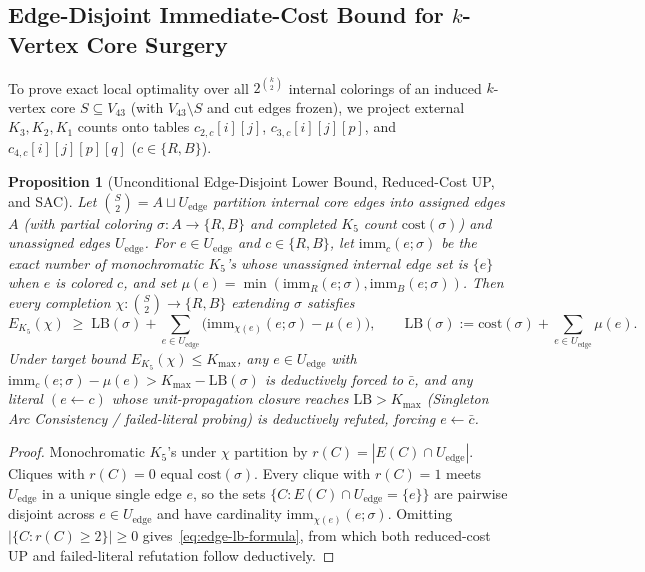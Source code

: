 \documentclass[11pt,a4paper]{article}
\theoremstyle{plain}
\newtheorem{proposition}[theorem]{Proposition}
\theoremstyle{definition}
\begin{document}
\subsection{Edge-Disjoint Immediate-Cost Bound for \texorpdfstring{$k$}{k}-Vertex Core Surgery}

To prove exact local optimality over all $2^{\binom{k}{2}}$ internal colorings of an induced $k$-vertex core $S \subseteq V_{43}$ (with $V_{43} \setminus S$ and cut edges frozen), we project external $K_3, K_2, K_1$ counts onto tables $c_{2,c}[i][j]$, $c_{3,c}[i][j][p]$, and $c_{4,c}[i][j][p][q]$ ($c \in \{R,B\}$).

\begin{proposition}[Unconditional Edge-Disjoint Lower Bound, Reduced-Cost UP, and SAC]\label{prop:edge-lb}
Let $\binom{S}{2} = A \sqcup U_{\mathrm{edge}}$ partition internal core edges into assigned edges $A$ (with partial coloring $\sigma : A \to \{R,B\}$ and completed $K_5$ count $\mathrm{cost}(\sigma)$) and unassigned edges $U_{\mathrm{edge}}$. For $e \in U_{\mathrm{edge}}$ and $c \in \{R,B\}$, let $\mathrm{imm}_c(e;\sigma)$ be the exact number of monochromatic $K_5$'s whose unassigned internal edge set is $\{e\}$ when $e$ is colored $c$, and set $\mu(e) = \min(\mathrm{imm}_R(e;\sigma), \mathrm{imm}_B(e;\sigma))$. Then every completion $\chi : \binom{S}{2} \to \{R,B\}$ extending $\sigma$ satisfies
\begin{equation}\label{eq:edge-lb-formula}
  E_{K_5}(\chi) \;\ge\; \mathrm{LB}(\sigma) + \sum_{e \in U_{\mathrm{edge}}} \bigl(\mathrm{imm}_{\chi(e)}(e;\sigma) - \mu(e)\bigr),
  \qquad \mathrm{LB}(\sigma) := \mathrm{cost}(\sigma) + \sum_{e \in U_{\mathrm{edge}}} \mu(e).
\end{equation}
Under target bound $E_{K_5}(\chi) \le K_{\max}$, any $e \in U_{\mathrm{edge}}$ with $\mathrm{imm}_c(e;\sigma) - \mu(e) > K_{\max} - \mathrm{LB}(\sigma)$ is deductively forced to $\bar{c}$, and any literal $(e \leftarrow c)$ whose unit-propagation closure reaches $\mathrm{LB} > K_{\max}$ (Singleton Arc Consistency / failed-literal probing) is deductively refuted, forcing $e \leftarrow \bar{c}$.
\end{proposition}
\begin{proof}
Monochromatic $K_5$'s under $\chi$ partition by $r(C) = |E(C) \cap U_{\mathrm{edge}}|$. Cliques with $r(C) = 0$ equal $\mathrm{cost}(\sigma)$. Every clique with $r(C) = 1$ meets $U_{\mathrm{edge}}$ in a unique single edge $e$, so the sets $\{C : E(C) \cap U_{\mathrm{edge}} = \{e\}\}$ are pairwise disjoint across $e \in U_{\mathrm{edge}}$ and have cardinality $\mathrm{imm}_{\chi(e)}(e;\sigma)$. Omitting $|\{C : r(C) \ge 2\}| \ge 0$ gives~\eqref{eq:edge-lb-formula}, from which both reduced-cost UP and failed-literal refutation follow deductively.
\end{proof}
\end{document}
